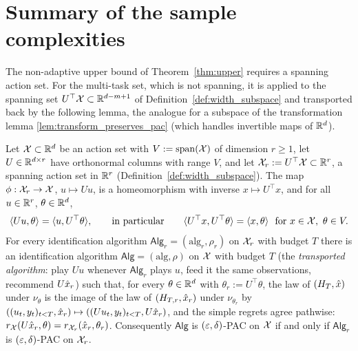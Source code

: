 \section{Summary of the sample complexities}
\label{sec:log_gains_table}

The non-adaptive upper bound of Theorem~\ref{thm:upper} requires a spanning action set. For
the multi-task set, which is not spanning, it is applied to the spanning set
$U^\top\mathcal{X} \subset \mathbb{R}^{d-m+1}$ of Definition~\ref{def:width_subspace} and transported back
by the following lemma, the analogue for a subspace of the transformation lemma
\ref{lem:transform_preserves_pac} (which handles invertible maps of $\mathbb{R}^d$).

\begin{lemma}\label{lem:log_gains_subspace_transport}
Let $\mathcal{X} \subset \mathbb{R}^d$ be an action set with $V := \operatorname{span}(\mathcal{X})$ of dimension $r \ge 1$, let
$U \in \mathbb{R}^{d\times r}$ have orthonormal columns with range $V$, and let
$\mathcal{X}_r := U^\top\mathcal{X} \subset \mathbb{R}^r$, a spanning action set in $\mathbb{R}^r$
(Definition~\ref{def:width_subspace}). The map $\phi : \mathcal{X}_r \to \mathcal{X}$, $u \mapsto Uu$, is a
homeomorphism with inverse $x \mapsto U^\top x$, and for all $u \in \mathbb{R}^r$, $\theta \in \mathbb{R}^d$,
\[
  \langle Uu, \theta \rangle = \langle u, U^\top\theta \rangle, \qquad\text{in particular}\qquad
  \langle U^\top x, U^\top\theta \rangle = \langle x, \theta \rangle \ \text{ for } x \in \mathcal{X},\ \theta \in V .
\]
For every identification algorithm $\mathsf{Alg}_r = (\mathrm{alg}_r,\rho_r)$ on $\mathcal{X}_r$ with
budget $T$ there is an identification algorithm $\mathsf{Alg} = (\mathrm{alg},\rho)$ on
$\mathcal{X}$ with budget $T$ (the \emph{transported algorithm}: play $Uu$ whenever $\mathsf{Alg}_r$
plays $u$, feed it the same observations, recommend $U\hat{x}_r$) such that, for every
$\theta \in \mathbb{R}^d$ with $\theta_r := U^\top\theta$, the law of $(H_T,\hat{x})$ under
$\nu_\theta$ is the image of the law of $(H_{T,r},\hat{x}_r)$ under $\nu_{\theta_r}$ by
$((u_t,y_t)_{t<T},\hat{x}_r) \mapsto ((Uu_t,y_t)_{t<T},U\hat{x}_r)$, and the simple regrets agree
pathwise: $r_{\mathcal{X}}(U\hat{x}_r,\theta) = r_{\mathcal{X}_r}(\hat{x}_r,\theta_r)$. Consequently
$\mathsf{Alg}$ is $(\varepsilon,\delta)$-PAC on $\mathcal{X}$ if and only if $\mathsf{Alg}_r$ is
$(\varepsilon,\delta)$-PAC on $\mathcal{X}_r$.
\end{lemma}

